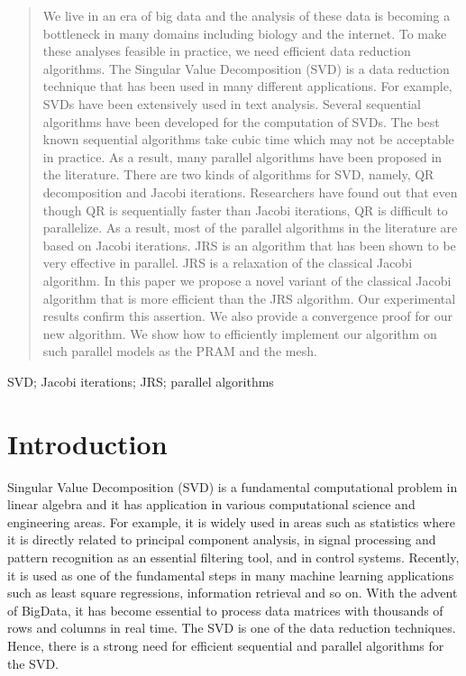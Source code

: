 \documentclass[10pt, conference, compsocconf]{IEEEtran}
\begin{document}
\begin{abstract}
We live in an era of big data and the analysis of these data is becoming a bottleneck in many domains including biology and the internet. To make these analyses feasible in practice, we need efficient data reduction algorithms. The Singular Value Decomposition (SVD) is a data reduction technique that has been used in many different applications. For example, SVDs have been extensively used in text analysis. Several sequential algorithms have been developed for the computation of SVDs. The best known sequential algorithms take cubic time which may not be acceptable in practice. As a result, many parallel algorithms have been proposed in the literature. There are two kinds of algorithms for SVD, namely, QR decomposition and Jacobi iterations. Researchers have found out that even though QR is sequentially faster than Jacobi iterations, QR is difficult to parallelize. As a result, most of the parallel algorithms in the literature are based on Jacobi iterations. JRS is an algorithm that has been shown to be very effective in parallel. JRS is a relaxation of the classical Jacobi algorithm. In this paper we propose a novel variant of the classical Jacobi algorithm that is more efficient than the JRS algorithm. Our experimental results confirm this assertion. We also provide a convergence proof for our new algorithm. We show how to efficiently implement our algorithm on such parallel models as the PRAM and the mesh. 
\end{abstract}

\begin{IEEEkeywords}
SVD; Jacobi iterations; JRS; parallel algorithms
\end{IEEEkeywords}


%
\IEEEpeerreviewmaketitle



\section{Introduction}

Singular Value Decomposition (SVD) is a fundamental computational problem in linear algebra and it has application in various computational science and engineering areas. For example, it is widely used in areas such as statistics where it is directly related to principal component analysis, in signal processing and pattern recognition as an essential filtering tool, and in control systems. Recently, it is used as one of the fundamental steps in many machine learning applications such as least square regressions, information retrieval and so on. With the advent of BigData, it has become essential to process data matrices with thousands of rows and columns in real time. The SVD is one of the data reduction techniques. Hence, there is a strong need for efficient sequential and parallel algorithms for the SVD.
\end{document}
